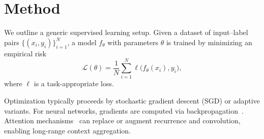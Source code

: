 \section{Method}
We outline a generic supervised learning setup. Given a dataset of input--label pairs $\{(x_i, y_i)\}_{i=1}^N$, a model $f_\theta$ with parameters $\theta$ is trained by minimizing an empirical risk
\begin{equation}
  \mathcal{L}(\theta) = \frac{1}{N} \sum_{i=1}^{N} \ell\big(f_\theta(x_i), y_i\big),
\end{equation}
where $\ell$ is a task-appropriate loss.

Optimization typically proceeds by stochastic gradient descent (SGD) or adaptive variants. For neural networks, gradients are computed via backpropagation~\citep{rumelhart1986learning}. Attention mechanisms~\citep{vaswani2017attention} can replace or augment recurrence and convolution, enabling long-range context aggregation.

